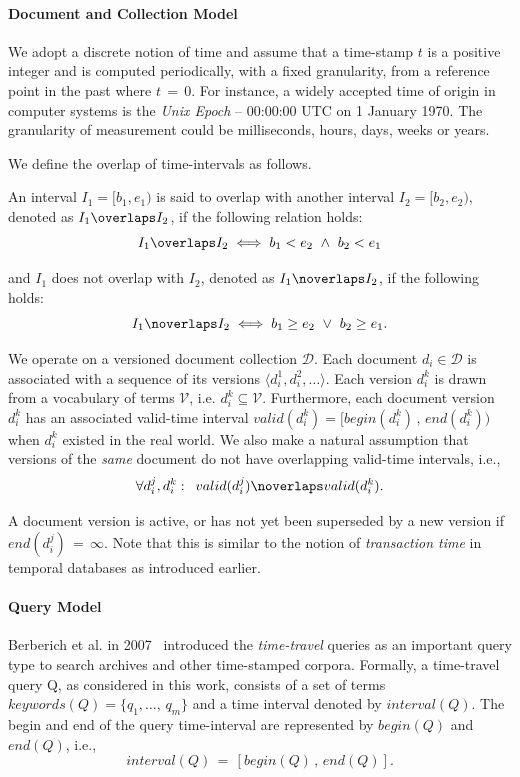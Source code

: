 \paragraph{Document and Collection Model}

We adopt a discrete notion of time and assume that a time-stamp $t$ is a positive integer and is computed periodically, with a fixed granularity, from a reference point in the past where $t\,=\,0$. For instance, a widely accepted time of origin in computer systems is the \emph{Unix Epoch} -- 00:00:00 UTC on 1 January 1970. The granularity of measurement could be milliseconds, hours, days, weeks or years.

We define the overlap of time-intervals as follows. 

\begin{definition}
	An interval $I_1 = [b_1, e_1)$ is said to overlap with another interval $I_2 = [b_2, e_2)$, denoted as $I_1 \overlaps I_2$, if the following relation holds:
$$ I_1 \overlaps I_2 \iff b_1 < e_2  \,\, \wedge \,\, b_2 < e_1
$$

and $I_1$ does not overlap with $I_2$, denoted as $I_1 \noverlaps I_2$, if the following holds: 
$$ I_1 \noverlaps I_2 \iff b_1 \geq e_2  \,\, \vee \,\, b_2 \geq e_1.
$$
\end{definition}


We operate on a versioned document collection $\mathcal{D}$. Each document $d_i \in \mathcal{D}$ is associated with a sequence of its versions $\langle d_i^{{1}}, d_i^{{2}}, \ldots \rangle$. Each version $d_i^k$ is drawn from a vocabulary of terms $\mathcal{V}$, i.e. $d_i^k \subseteq \mathcal{V}$. Furthermore, each document version $d_i^k$ has an associated valid-time interval $valid(d_i^k) = [begin(d_i^k) \,,\, end(d_i^k))$ when $d_i^k$ existed in the real world. We also make a natural assumption that versions of the \emph{same} document do not have overlapping valid-time intervals, i.e.,
$$ \forall d_i^j, d_i^k : \,\,\, valid(d_i^j) \noverlaps valid(d_i^k).
$$

 A document version is active, or has not yet been superseded by a new version if $end(d_i^j) \,=\, \infty$. Note that this is similar to the notion of \emph{transaction time} in temporal databases as introduced earlier.

\paragraph{Query Model}
Berberich et al. in 2007~\cite{kberberi:sigir2007} introduced the \emph{time-travel} queries as an important query type to search archives and other time-stamped corpora. Formally, a time-travel query Q, as considered in this work, consists of a set of
terms $keywords(Q)=\{q_1,\ldots,\,q_m\}$ and a time interval denoted by $interval(Q)$. The begin and end of the query time-interval are represented by $begin(Q)$ and $end(Q)$, i.e., 
$$interval(Q) \,= \,[begin(Q)\, ,\, end(Q)].$$

